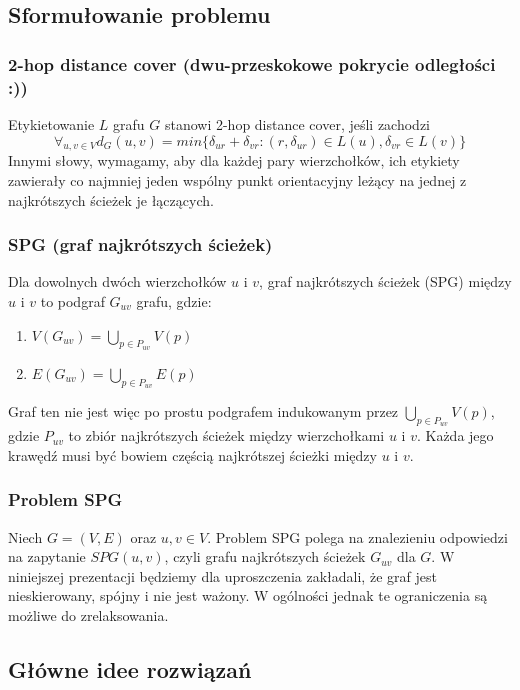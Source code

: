 \documentclass{article}
\theoremstyle{definition}
\begin{document}
    \subsection{Sformułowanie problemu}

        \subsubsection*{2-hop distance cover (dwu-przeskokowe pokrycie odległości :))}
            Etykietowanie $L$ grafu $G$ stanowi 2-hop distance cover, jeśli zachodzi 
            \[
                \forall_{u,v \in V} d_G(u, v) = min\{\delta_{ur} + \delta_{vr} : (r, \delta_{ur}) \in L(u), \delta_{vr} \in L(v)\}    
            \]
            Innymi słowy, wymagamy, aby dla każdej pary wierzchołków, ich etykiety zawierały co najmniej jeden wspólny punkt orientacyjny leżący na jednej z najkrótszych ścieżek je łączących. 
    
        \subsubsection*{SPG (graf najkrótszych ścieżek)}
            Dla dowolnych dwóch wierzchołków $u$ i $v$, graf najkrótszych ścieżek (SPG) między $u$ i $v$ to podgraf $G_{uv}$ grafu, gdzie:
            \begin{enumerate}
                \item $V(G_{uv}) = \bigcup_{p \in P_{uv}} V(p)$
                \item $E(G_{uv}) = \bigcup_{p \in P_{uv}} E(p)$
            \end{enumerate}
            Graf ten nie jest więc po prostu podgrafem indukowanym przez $\bigcup_{p \in P_{uv}} V(p)$, gdzie $P_{uv}$ to zbiór najkrótszych ścieżek między wierzchołkami $u$ i $v$. Każda jego krawędź musi być bowiem częścią najkrótszej ścieżki między $u$ i $v$. 

        \subsubsection*{Problem SPG}
            Niech $G = (V, E)$ oraz $u,v \in V$. Problem SPG polega na znalezieniu odpowiedzi na zapytanie $SPG(u,v)$, czyli grafu najkrótszych ścieżek $G_{uv}$ dla $G$. W niniejszej prezentacji będziemy dla uproszczenia zakładali, że graf jest nieskierowany, spójny i nie jest ważony. W ogólności jednak te ograniczenia są możliwe do zrelaksowania. 

    \subsection{Główne idee rozwiązań}
\end{document}
